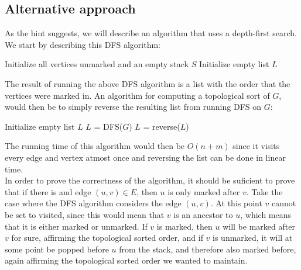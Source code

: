 \documentclass[a4paper]{article}
\begin{document}
\subsection{Alternative approach}
As the hint suggests, we will describe an algorithm that uses a depth-first search. We start by describing this DFS algorithm:\\

\begin{algorithm}[H]
  Initialize all vertices unmarked and an empty stack $S$\;
  Initialize empty list $L$\;
\end{algorithm}
The result of running the above DFS algorithm is a list with the order that the vertices were marked in. An algorithm for computing a topological sort of $G$, would then be to simply reverse the resulting list from running DFS on $G$:\\

\begin{algorithm}[H]
  Initialize empty list $L$\;
  $L$ = DFS($G$)\;
  $L$ = reverse($L$)
\end{algorithm}

The running time of this algorithm would then be $O(n+m)$ since it visits every edge and vertex atmost once and reversing the list can be done in linear time.\\

In order to prove the correctness of the algorithm, it should be suficient to prove that if there is and edge $(u,v)\in E$, then $u$ is only marked after $v$. Take the case where the DFS algorithm considers the edge $(u,v)$. At this point $v$ cannot be set to visited, since this would mean that $v$ is an ancestor to $u$, which means that it is either marked or unmarked. If $v$ is marked, then $u$ will be marked after $v$ for sure, affirming the topological sorted order, and if $v$ is unmarked,
it will at some point be popped before $u$ from the stack, and therefore also marked before, again affirming the topological sorted order we wanted to maintain.
\end{document}
